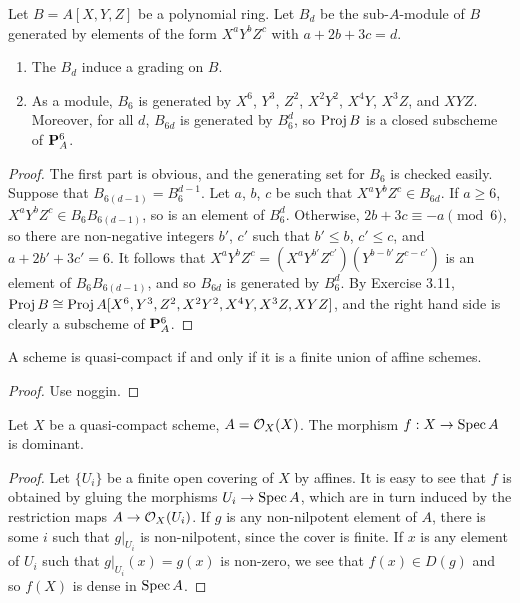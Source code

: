 \begin{exer}
	Let $B = A[X,Y,Z]$ be a polynomial ring. Let $B_d$ be the sub-$A$-module
	of $B$ generated by elements of the form $X^aY^bZ^c$ with $a+2b+3c=d$.
	\begin{enumerate}[label=(\alph*)]
		\item The $B_d$ induce a grading on $B$.
		\item As a module, $B_6$ is generated by $X^6$, $Y^3$, $Z^2$,
			$X^2Y^2$, $X^4Y$, $X^3Z$, and $XYZ$. Moreover, for all
			$d$, $B_{6d}$ is generated by $B_6^d$, so $\operatorname{Proj} B$ is
			a closed subscheme of $\mathbf{P}^6_A$.
	\end{enumerate}
\end{exer}
\begin{proof}
	The first part is obvious, and the generating set for $B_6$ is checked
	easily. Suppose that $B_{6(d-1)} = B_6^{d-1}$. Let $a$, $b$, $c$ be
	such that $X^aY^bZ^c \in B_{6d}$. If $a \geq 6$, $X^aY^bZ^c \in
	B_6B_{6(d-1)}$, so is an element of $B_6^d$. Otherwise, $2b + 3c
	\equiv -a \pmod{6}$, so there are non-negative integers $b'$, $c'$ such
	that $b' \leq b$, $c' \leq c$, and $a + 2b' + 3c' = 6$. It follows that
	$X^aY^bZ^c = (X^aY^{b'}Z^{c'})(Y^{b-b'}Z^{c-c'})$ is an element of
	$B_6B_{6(d-1)}$, and so $B_{6d}$ is generated by $B_6^d$. By Exercise
	3.11, $\operatorname{Proj} B \cong \operatorname{Proj} A[X^6,Y^3,Z^2,X^2Y^2,X^4Y,X^3Z,XYZ]$, and the
	right hand side is clearly a subscheme of $\mathbf{P}^6_A$.
\end{proof}

\begin{exer}
	A scheme is quasi-compact if and only if it is a finite union of affine
	schemes.
\end{exer}
\begin{proof}
	Use noggin.
\end{proof}

\begin{exer}
	Let $X$ be a quasi-compact scheme, $A = \mathcal{O}_X(X)$. The morphism $f: X
	\to \operatorname{Spec} A$ is dominant.
\end{exer}
\begin{proof}
	Let $\{U_i\}$ be a finite open covering of $X$ by affines. It is easy to
	see that $f$ is obtained by gluing the morphisms $U_i \to \operatorname{Spec} A$,
	which are in turn induced by the restriction maps $A \to \mathcal{O}_X(U_i)$. If
	$g$ is any non-nilpotent element of $A$, there is some $i$ such that
	${g|}_{U_i}$ is non-nilpotent, since the cover is finite. If $x$ is any
	element of $U_i$ such that ${g|}_{U_i}(x) = g(x)$ is non-zero, we see
	that $f(x) \in D(g)$ and so $f(X)$ is dense in $\operatorname{Spec} A$.
\end{proof}

